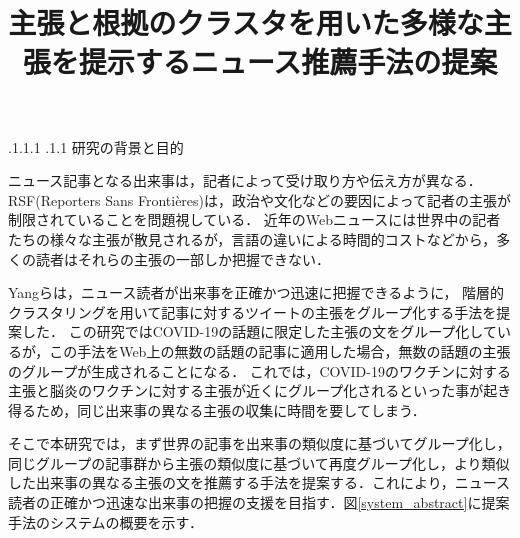 \documentclass[a4paper, twocolumn, 10pt]{jarticle}
\makeatletter
\def\section{%
	\@startsection{section}{1}{\z@}%
	{.1\Cvs \@plus.1\Cdp \@minus.1\Cdp}%
	{.1\Cvs \@plus.1\Cdp}%
	{\normalfont\normalsize\bfseries}%
}
\makeatother
\begin{document}
\title{主張と根拠のクラスタを用いた多様な主張を提示するニュース推薦手法の提案}

\maketitle

\thispagestyle{empty}

\section{研究の背景と目的}

ニュース記事となる出来事は，記者によって受け取り方や伝え方が異なる．
RSF(Reporters Sans Frontières)は，政治や文化などの要因によって記者の主張が制限されていることを問題視している\cite{2021_world_press_freedom_index}．
近年のWebニュースには世界中の記者たちの様々な主張が散見されるが，言語の違いによる時間的コストなどから，多くの読者はそれらの主張の一部しか把握できない．

Yangらは，ニュース読者が出来事を正確かつ迅速に把握できるように，
階層的クラスタリングを用いて記事に対するツイートの主張をグループ化する手法を提案した\cite{yang_scalable_2021}．
この研究ではCOVID-19の話題に限定した主張の文をグループ化しているが，この手法をWeb上の無数の話題の記事に適用した場合，無数の話題の主張のグループが生成されることになる．
これでは，COVID-19のワクチンに対する主張と脳炎のワクチンに対する主張が近くにグループ化されるといった事が起き得るため，同じ出来事の異なる主張の収集に時間を要してしまう．





そこで本研究では，まず世界の記事を出来事の類似度に基づいてグループ化し，同じグループの記事群から主張の類似度に基づいて再度グループ化し，より類似した出来事の異なる主張の文を推薦する手法を提案する．これにより，ニュース読者の正確かつ迅速な出来事の把握の支援を目指す．図\ref{system_abstract}に提案手法のシステムの概要を示す．
\end{document}

